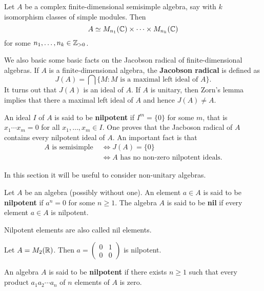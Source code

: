 \begin{theorem}
Let $A$ be a complex finite-dimensional semisimple algebra, say with  
$k$ isomorphism classes of simple modules. Then 
\[
A\simeq M_{n_1}(\mathbb{C})\times\cdots\times M_{n_k}(\mathbb{C})
\]
for some $n_1,\dots,n_k\in\mathbb{Z}_{>0}$.
\end{theorem}

We also basic some basic facts on the Jacobson radical
of finite-dimensional algebras. If $A$ is a finite-dimensional algebra, the \textbf{Jacobson radical} is defined as 
\[
J(A)=\bigcap\{M:M\text{ is a maximal left ideal of $A$}\}. 
\]
It turns out that $J(A)$ is an ideal of $A$. If $A$ is
unitary, then Zorn's lemma implies that there a 
maximal left ideal of $A$ and hence $J(A)\ne A$. 

An ideal $I$ of $A$ is said to be \textbf{nilpotent}
if $I^m=\{0\}$ for some $m$, that is 
$x_1\cdots x_m=0$ for all $x_1,\dots,x_m\in I$. 
One proves that the Jacboson radical of $A$ 
contains every nilpotent ideal of $A$. An important
fact is that 
\begin{align*}
A\text{ is semisimple }
&\Longleftrightarrow 
J(A)=\{0\}\\
&\Longleftrightarrow 
A\text{ has no non-zero nilpotent ideals}.
\end{align*}

\label{Kolchin}

In this section it will be useful to consider 
non-unitary algebras. 

\begin{definition}
    Let $A$ be an algebra (possibly without one). An element $a\in A$
    is said to be \textbf{nilpotent} if 
    $a^n=0$ for some $n\geq1$. The algebra $A$ is said to be
    \textbf{nil} if every element $a\in A$ is nilpotent. 
\end{definition}

Nilpotent elements are also called nil elements.  

\begin{example}
    Let $A=M_2(\mathbb{R})$. Then $a=\begin{pmatrix}0&1\\0&0\end{pmatrix}$ is nilpotent. 
\end{example}

\begin{definition}
    An algebra $A$ is said to be \textbf{nilpotent} if there exists
    $n\geq1$ such that every product 
    $a_1a_2\cdots a_n$
    of $n$ elements of $A$ is zero. 
\end{definition}

